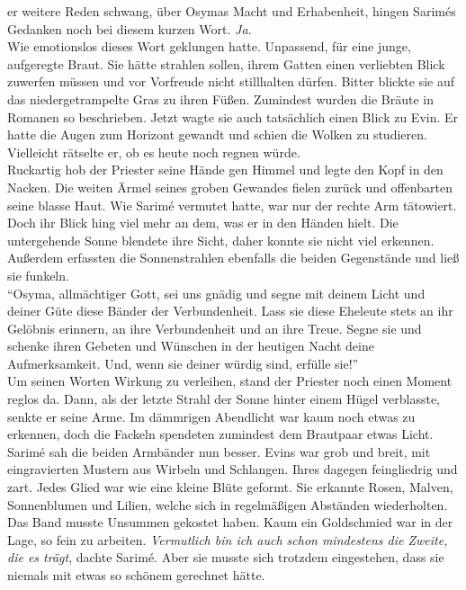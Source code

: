 er weitere Reden schwang, über Osymas Macht und Erhabenheit, hingen Sarimés Gedanken noch bei 
diesem kurzen Wort. \textit{Ja.}\\
Wie emotionslos dieses Wort geklungen hatte. Unpassend, für eine junge, aufgeregte Braut. Sie hätte 
strahlen sollen, ihrem Gatten einen verliebten Blick zuwerfen müssen und vor Vorfreude nicht 
stillhalten dürfen. Bitter blickte sie auf das niedergetrampelte Gras zu ihren Füßen. Zumindest 
wurden die Bräute in Romanen so beschrieben. Jetzt wagte sie auch tatsächlich einen Blick zu Evin. 
Er hatte die Augen zum Horizont gewandt und schien die Wolken zu studieren. Vielleicht rätselte er, 
ob es heute noch regnen würde.\\
Ruckartig hob der Priester seine Hände gen Himmel und legte den Kopf in den Nacken. Die weiten 
Ärmel seines groben Gewandes fielen zurück und offenbarten seine blasse Haut. Wie Sarimé vermutet 
hatte, war nur der rechte Arm tätowiert. Doch ihr Blick hing viel mehr an dem, was er in den Händen 
hielt. Die untergehende Sonne blendete ihre Sicht, daher konnte sie nicht viel erkennen. Außerdem 
erfassten die Sonnenstrahlen ebenfalls die beiden Gegenstände und ließ sie funkeln. \\
``Osyma, allmächtiger Gott, sei uns gnädig und segne mit deinem Licht und deiner Güte diese Bänder 
der Verbundenheit. Lass sie diese Eheleute stets an ihr Gelöbnis erinnern, an ihre Verbundenheit 
und an ihre Treue. Segne sie und schenke ihren Gebeten und Wünschen in der heutigen Nacht deine 
Aufmerksamkeit. Und, wenn sie deiner würdig sind, erfülle sie!''\\
Um seinen Worten Wirkung zu verleihen, stand der Priester noch einen Moment reglos da. Dann, als 
der letzte Strahl der Sonne hinter einem Hügel verblasste, senkte er seine Arme. Im dämmrigen 
Abendlicht war kaum noch etwas zu erkennen, doch die Fackeln spendeten zumindest dem Brautpaar 
etwas Licht. Sarimé sah die beiden Armbänder nun besser. Evins war grob und breit, mit 
eingravierten Mustern aus Wirbeln und Schlangen. Ihres dagegen feingliedrig und zart. Jedes Glied 
war wie eine kleine Blüte geformt. Sie erkannte Rosen, Malven, Sonnenblumen und Lilien, welche sich 
in regelmäßigen Abständen wiederholten. Das Band musste Unsummen gekostet haben. Kaum ein 
Goldschmied war in der Lage, so fein zu arbeiten. \textit{Vermutlich bin ich auch schon mindestens 
die Zweite, die es trägt}, dachte Sarimé. Aber sie musste sich trotzdem eingestehen, dass sie 
niemals mit etwas so schönem gerechnet hätte.\\
